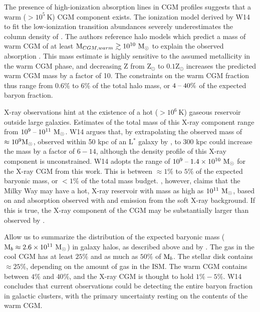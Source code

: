 The presence of high-ionization absorption lines in CGM profiles
suggests that a warm ($>10^5~\textrm{K}$) CGM component exists. The
ionization model derived by W14 to fit the low-ionization transition
abundances severely underestimates the column density of
. The authors reference halo models which predict a mass of
warm CGM of at least $\textrm{M}_{CGM, warm} \gtrsim 10^{10}~\textrm{M}_\odot{}$ to
explain the observed  absorption \citep{Peeples2014}. This
mass estimate is highly sensitive to the assumed metallicity in the
warm CGM phase, and decreasing Z from Z$_\odot$ to $0.1$Z$_\odot$
increases the predicted warm CGM mass by a factor of 10. The
constraints on the warm CGM fraction thus range from $0.6\%$ to $6\%$
of the total halo mass, or $4\;\textrm{--}\;40\%$ of the expected baryon fraction.

X-ray observations hint at the existence of a hot ($>10^6~\textrm{K}$)
gaseous reservoir outside large galaxies. Estimates of the total mass
of this X-ray component range from $10^9\;\textrm{--}\;10^{11}~\textrm{M}_\odot{}$. W14
argues that, by extrapolating the observed mass of $\approx
10^9\textrm{M}_\odot{}$, observed within 50 kpc of an L$^*$ galaxy by \Rosat{}
\citep{Anderson2013}, to 300 kpc could increase the mass by a factor
of $6-14$, although the density profile of this X-ray component is
unconstrained. W14 adopts the range of $10^9 \;\textrm{--}\;
1.4\times 10^{10}~\textrm{M}_\odot{}$ for the X-ray CGM from this work. This is
between $\approx 1\%$ to $5\%$ of the expected baryonic mass, or
$<1\%$ of the total mass budget. \citet{Gupta2012}, however, claims
that the Milky Way may have a hot, X-ray reservoir with mass as high
as $10^{11}~\textrm{M}_\odot{}$, based on  and 
absorption observed with \XMM{} and emission from the soft X-ray
background. If this is true, the X-ray component of the CGM may be
substantially larger than observed by \citet{Anderson2013}.

Allow us to summarize the distribution of the expected baryonic mass
($\textrm{M}{}_b\approx 2.6\times 10^{11}~\textrm{M}_\odot{}$) in galaxy halos, as
described above and by \citet{Werk2014}. The gas in the cool CGM has
at least $25\%$ and as much as $50\%$ of $\textrm{M}{}_{b}$. The stellar
disk contains $\approx25\%$, depending on the amount of gas in the
ISM. The warm CGM contains between $4\%$ and $40\%$, and the X-ray CGM
is thought to hold $1\% - 5\%$. W14 concludes that current
observations could be detecting the entire baryon fraction in galactic
clusters, with the primary uncertainty resting on the contents of the
warm CGM.

